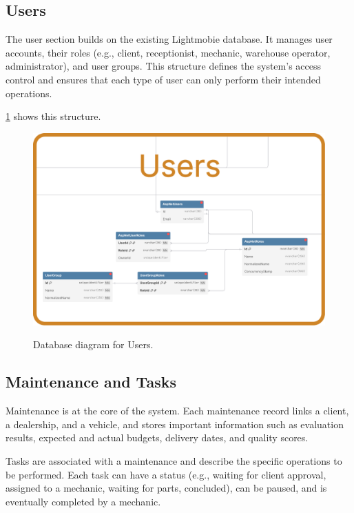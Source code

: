 \subsection{Users} 

The user section builds on the existing Lightmobie database. It manages user accounts, their roles (e.g., client, receptionist, mechanic, warehouse operator, administrator), and user groups. This structure defines the system’s access control and ensures that each type of user can only perform their intended operations.

\ref{fig:dbUsers} shows this structure.

\begin{figure}[h]
  \caption{Database diagram for Users.}
  \centering
  \includegraphics[width=\textwidth]{figs/dbDiagrams/Users}
  \label{fig:dbUsers}
\end{figure}


\subsection{Maintenance and Tasks} 


Maintenance is at the core of the system. Each maintenance record links a client, a dealership, and a vehicle, and stores important information such as evaluation results, expected and actual budgets, delivery dates, and quality scores.

Tasks are associated with a maintenance and describe the specific operations to be performed. Each task can have a status (e.g., waiting for client approval, assigned to a mechanic, waiting for parts, concluded), can be paused, and is eventually completed by a mechanic.

